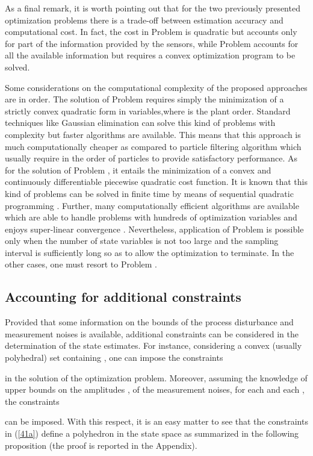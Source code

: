 \documentclass[11pt,journal,onecolumn]{IEEEtran}
\begin{document}
As a final remark, it is worth pointing out that for the two previously presented optimization problems there is a trade-off between estimation accuracy and computational cost. In fact, the cost in Problem  is quadratic but accounts only for part of the information provided by the sensors, while Problem  accounts for all the available information but requires a convex optimization program to be solved.

Some considerations on the computational complexity of the proposed approaches are in order. The solution of Problem   requires simply the minimization of a strictly convex quadratic form in  variables,where  is the plant order. Standard techniques like Gaussian elimination can solve this kind of problems with complexity  but faster algorithms are available. This means that this approach is much computationally cheaper as compared to particle filtering algorithm which usually require in the order of  particles to provide satisfactory performance. As for the solution of Problem , it entails the minimization of a convex and continuously differentiable piecewise quadratic cost function. It is known that this kind of problems can be solved in finite time by means of sequential quadratic programming \cite{PWCP}. Further, many computationally efficient algorithms are available which are able to handle problems with hundreds of optimization variables \cite{OPT1,OPT2} and enjoys super-linear convergence \cite{bounds}. Nevertheless, application of Problem  is possible only when the number  of state variables is not too large and the sampling interval is sufficiently long so as to allow the optimization to terminate. In the other cases, one must resort to Problem .

\subsection{Accounting for additional constraints}

Provided that some information on the bounds of the process disturbance  and measurement noises  is available, additional constraints can be considered in the determination of the state estimates. For instance, considering a convex (usually polyhedral) set  containing , one can impose the constraints

in the solution of the optimization problem.
Moreover, assuming the knowledge of upper bounds  on the amplitudes , of the
measurement noises, for each  and each , the constraints

can be imposed. With this respect, it is an easy matter to see that the constraints in (\ref{41a}) define a polyhedron in the state space as summarized in the following proposition (the proof is reported in the Appendix).
\vspace{.3 cm}
\end{document}
